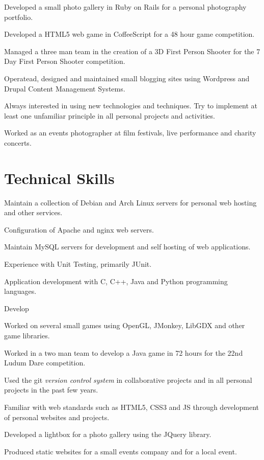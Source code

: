 \documentclass[11pt,a4paper]{article}
\renewenvironment{itemize}{
  \begin{list}{}{
    \setlength{\leftmargin}{1em}
    \setlength{\itemsep}{0.25em}
    \setlength{\parskip}{0pt}
    \setlength{\parsep}{0.25em}
    \renewcommand{\labelitemi}{$\bullet$}
  }
}{
  \end{list}
}
\begin{document}
\begin{itemize}
    \item Developed a small photo gallery in Ruby on Rails for a personal
        photography portfolio.
    \item Developed a HTML5 web game in CoffeeScript for a 48 hour game
        competition.
    \item Managed a three man team in the creation of a 3D First Person Shooter
        for the 7 Day First Person Shooter competition.
    \item Operatead, designed and maintained small blogging sites using
        Wordpress and Drupal Content Management Systems.
    \item Always interested in using new technologies and techniques. Try to
        implement at least one unfamiliar principle in all personal projects and
        activities.
    \item Worked as an events photographer at film festivals, live
        performance and charity concerts.
\end{itemize}

\section*{Technical Skills}


\begin{itemize}
    \item Maintain a collection of Debian and Arch Linux servers for personal web hosting and other services.
    \item Configuration of Apache and nginx web servers.
    \item Maintain MySQL servers for development and self hosting of web applications.
    \item Experience with Unit Testing, primarily JUnit.
    \item Application development with C, C++, Java and Python programming languages.
    \item Develop
    \item Worked on several small games using OpenGL, JMonkey, LibGDX and other game libraries.
    \item Worked in a  two man team to develop a Java game in 72 hours for the
        22nd Ludum Dare competition.
    \item Used the git \emph{version control system} in collaborative projects
        and in all personal projects in the past few years.
    \item Familiar with web standards such as HTML5, CSS3 and JS through development of personal websites and projects.
    \item Developed a lightbox for a photo gallery using the JQuery library.
    \item Produced static websites for a small events company and for a local event.
\end{itemize}
\end{document}
